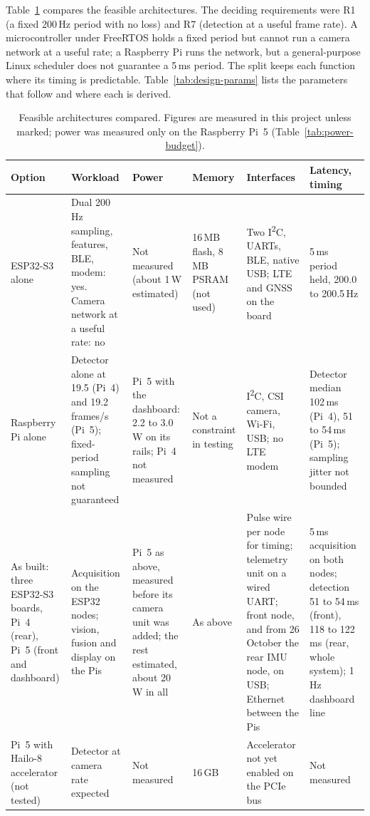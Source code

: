 Table~\ref{tab:architectures} compares the feasible architectures. The deciding requirements were R1 (a fixed 200\,Hz period with no loss) and R7 (detection at a useful frame rate). A microcontroller under FreeRTOS holds a fixed period but cannot run a camera network at a useful rate; a Raspberry Pi runs the network, but a general-purpose Linux scheduler does not guarantee a 5\,ms period. The split keeps each function where its timing is predictable. Table~\ref{tab:design-params} lists the parameters that follow and where each is derived.

\begin{table}[htbp]
\centering
\small
\caption[Feasible architectures compared]{Feasible architectures compared. Figures are measured in this project unless marked; power was measured only on the Raspberry Pi~5 (Table~\ref{tab:power-budget}).}
\label{tab:architectures}
\begin{tabular}{|p{2.0cm}|p{2.9cm}|p{2.1cm}|p{1.7cm}|p{2.2cm}|p{2.1cm}|}
\hline
\textbf{Option} & \textbf{Workload} & \textbf{Power} & \textbf{Memory} & \textbf{Interfaces} & \textbf{Latency, timing} \\ \hline
ESP32-S3 alone & Dual 200\,Hz sampling, features, BLE, modem: yes. Camera network at a useful rate: no & Not measured (about 1\,W estimated) & 16\,MB flash, 8\,MB PSRAM (not used) & Two I\textsuperscript{2}C, UARTs, BLE, native USB; LTE and GNSS on the board & 5\,ms period held, 200.0 to 200.5\,Hz \\ \hline
Raspberry Pi alone & Detector alone at 19.5 (Pi~4) and 19.2\,frames/s (Pi~5); fixed-period sampling not guaranteed & Pi~5 with the dashboard: 2.2 to 3.0\,W on its rails; Pi~4 not measured & Not a constraint in testing & I\textsuperscript{2}C, CSI camera, Wi-Fi, USB; no LTE modem & Detector median 102\,ms (Pi~4), 51 to 54\,ms (Pi~5); sampling jitter not bounded \\ \hline
As built: three ESP32-S3 boards, Pi~4 (rear), Pi~5 (front and dashboard) & Acquisition on the ESP32 nodes; vision, fusion and display on the Pis & Pi~5 as above, measured before its camera unit was added; the rest estimated, about 20\,W in all & As above & Pulse wire per node for timing; telemetry unit on a wired UART; front node, and from 26 October the rear IMU node, on USB; Ethernet between the Pis & 5\,ms acquisition on both nodes; detection 51 to 54\,ms (front), 118 to 122\,ms (rear, whole system); 1\,Hz dashboard line \\ \hline
Pi~5 with Hailo-8 accelerator (not tested) & Detector at camera rate expected & Not measured & 16\,GB & Accelerator not yet enabled on the PCIe bus & Not measured \\ \hline
\end{tabular}
\end{table}

